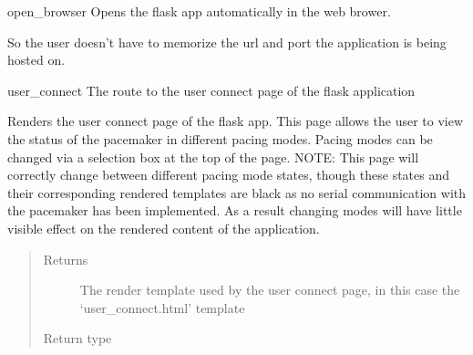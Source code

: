 \documentclass[letterpaper,10pt,english]{sphinxmanual}
\begin{document}

\begin{fulllineitems}
\label{\detokenize{flaskapp:flaskapp.app.open_browser}}
open\_browser Opens the flask app automatically in the web brower.

So the user doesn’t have to memorize the url and port the application
is being hosted on.

\end{fulllineitems}


\begin{fulllineitems}
\label{\detokenize{flaskapp:flaskapp.app.user_connect}}
user\_connect The route to the user connect page of the flask application

Renders the user connect page of the flask app. This page allows the user to
view the status of the pacemaker in different pacing modes. Pacing modes can
be changed via a selection box at the top of the page. NOTE: This page will
correctly change between different pacing mode states, though these states
and their corresponding rendered templates are black as no serial communication
with the pacemaker has been implemented. As a result changing modes will have little
visible effect on the rendered content of the application.
\begin{quote}\begin{description}
\item[{Returns}] \leavevmode
The render template used by the user connect page, in this case the ‘user\_connect.html’ template

\item[{Return type}] \leavevmode
{}

\end{description}\end{quote}

\end{fulllineitems}

\end{document}
